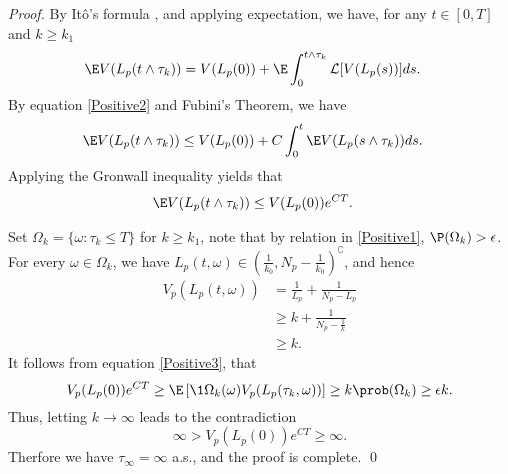 \begin{proof}
		By It\^{o}'s formula , and applying expectation, we have, for any 
	$t \in [0,T]$ and $k\geq k_1$
	\begin{align*}
		\E V(L_p(t\wedge\tau_k)) &= 
			V(L_p(0)) + 
			\E 
				\int_{0}^{t\wedge\tau_k} \mathcal{L}[V(L_p(s))]
			ds.
	\end{align*}
	By equation \eqref{Positive2} and Fubini's Theorem, we have
	\begin{align*}
		\E V(L_p(t\wedge\tau_k)) 
			&\leq 
				V(L_p(0)) + 
				C
				\int_{0}^{t}
					\E V(L_p(s\wedge\tau_k))
				ds.
	\end{align*}
	Applying the Gronwall inequality yields that	
	\begin{align}\label{Positive3}
		\E V(L_p(t\wedge\tau_k))&\leq V(L_p(0))e^{CT}.
	\end{align}

		Set 
	$
		\Omega_k = \{\omega : \tau_k\leq T\}
	$ for $k\geq k_1$, note that by relation in 
	\autoref{Positive1}, 
	$
		\P(\Omega_k) >  \epsilon
	$. For every 
	$
		\omega \in \Omega_k
	$, we have 
	$
		L_p(t,\omega) \in 
		\left(
			\frac{1}{k_0}, N_p - 
			\frac{1}{k_0}
		\right) ^ {\complement}
	$, and hence
	\begin{align*}
		V_p(L_p(t,\omega))
			&=
				\frac{1}{L_p} + 
				\frac{1}{N_p-L_p}
			\\
			&\geq 
				k + 
				\frac{1}{
					N_p - \frac{1}{k}}
			\\
			& \geq k.
	\end{align*}
%	
	It follows from equation \eqref{Positive3}, that
	\begin{equation*}
		V_p(L_p(0)) e^{CT}
			\geq 
			\E 
			\left[
				\1{\Omega_k} (\omega)
				V_p(L_p(\tau_k,\omega))
			\right]
			\geq k
			\prob (\Omega_k)\geq \epsilon k.
	\end{equation*}
%
	Thus, letting $k\rightarrow \infty$ leads to the contradiction
	\begin{equation*}
		\infty>V_p(L_p(0))e^{CT}\geq \infty.	
	\end{equation*}
%
	Therfore we  have $\tau_\infty=\infty$ a.s., and the proof is 
	complete. \qed
\end{proof}
